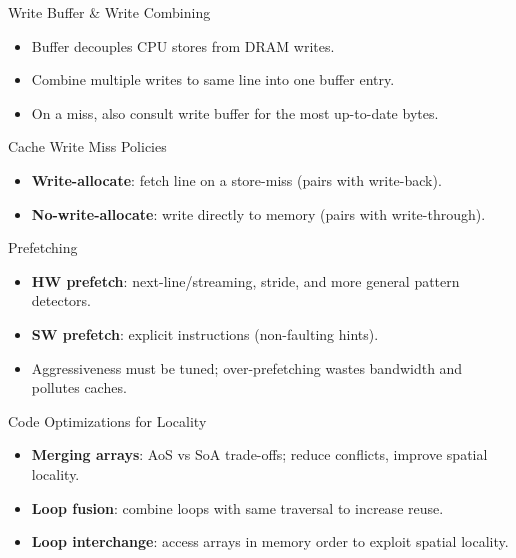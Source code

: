\documentclass[aspectratio=169,12pt]{beamer}
\begin{document}
\begin{frame}{Write Buffer \& Write Combining}
\begin{itemize}
  \item Buffer decouples CPU stores from DRAM writes.
  \item Combine multiple writes to same line into one buffer entry.
  \item On a miss, also consult write buffer for the most up-to-date bytes.
\end{itemize}
\end{frame}

\begin{frame}{Cache Write Miss Policies}
\begin{itemize}
  \item \textbf{Write-allocate}: fetch line on a store-miss (pairs with write-back).
  \item \textbf{No-write-allocate}: write directly to memory (pairs with write-through).
\end{itemize}
\end{frame}

\begin{frame}{Prefetching}
\begin{itemize}
  \item \textbf{HW prefetch}: next-line/streaming, stride, and more general pattern detectors.
  \item \textbf{SW prefetch}: explicit instructions (non-faulting hints).
  \item Aggressiveness must be tuned; over-prefetching wastes bandwidth and pollutes caches.
\end{itemize}
\end{frame}

\begin{frame}{Code Optimizations for Locality}
\begin{itemize}
  \item \textbf{Merging arrays}: AoS vs SoA trade-offs; reduce conflicts, improve spatial locality.
  \item \textbf{Loop fusion}: combine loops with same traversal to increase reuse.
  \item \textbf{Loop interchange}: access arrays in memory order to exploit spatial locality.
\end{itemize}
\end{frame}
\end{document}
